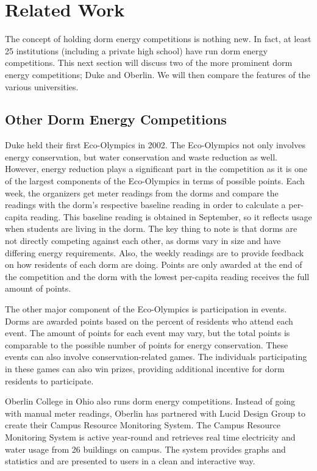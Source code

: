 \chapter{Related Work}
\label{relatedwork}

The concept of holding dorm energy competitions is nothing new.  In fact, at least 25 institutions (including a private high school) have run dorm energy competitions.  This next section will discuss two of the more prominent dorm energy competitions; Duke and Oberlin.  We will then compare the features of the various universities.

\section{Other Dorm Energy Competitions}
\label{othercomps}

Duke held their first Eco-Olympics\cite{duke-eco-lympics} in 2002.  The Eco-Olympics not only involves energy conservation, but water conservation and waste reduction as well.  However, energy reduction plays a significant part in the competition as it is one of the largest components of the Eco-Olympics in terms of possible points.  Each week, the organizers get meter readings from the dorms and compare the readings with the dorm's respective baseline reading in order to calculate a per-capita reading.  This baseline reading is obtained in September, so it reflects usage when students are living in the dorm.   The key thing to note is that dorms are not directly competing against each other, as dorms vary in size and have differing energy requirements.  Also, the weekly readings are to provide feedback on how residents of each dorm are doing.  Points are only awarded at the end of the competition and the dorm with the lowest per-capita reading receives the full amount of points.

The other major component of the Eco-Olympics is participation in events.  Dorms are awarded points based on the percent of residents who attend each event.  The amount of points for each event may vary, but the total points is comparable to the possible number of points for energy conservation.  These events can also involve conservation-related games.  The individuals participating in these games can also win prizes, providing additional incentive for dorm residents to participate.

Oberlin College in Ohio also runs dorm energy competitions.  Instead of going with manual meter readings, Oberlin has partnered with Lucid Design Group to create their Campus Resource Monitoring System\cite{oberlin-comp}.  The Campus Resource Monitoring System is active year-round and retrieves real time electricity and water usage from 26 buildings\cite{lucid-oberlin} on campus.  The system provides graphs and statistics and are presented to users in a clean and interactive way.

